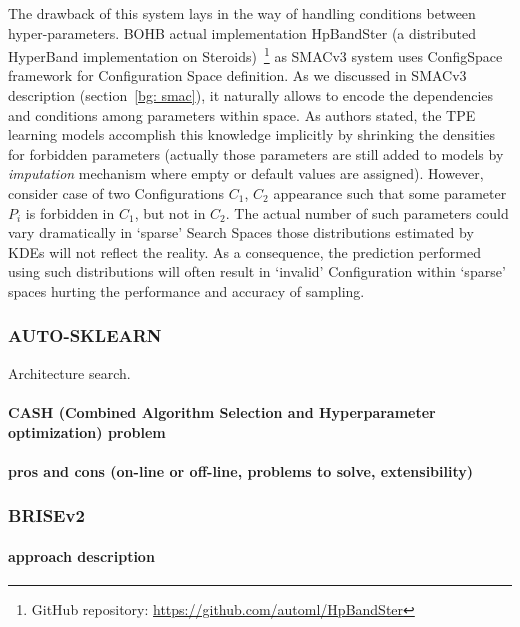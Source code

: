 The drawback of this system lays in the way of handling conditions between hyper-parameters. BOHB actual implementation HpBandSter (a distributed HyperBand implementation on Steroids)~\footnote{GitHub repository: \url{https://github.com/automl/HpBandSter}} as SMACv3 system uses ConfigSpace framework for Configuration Space definition. As we discussed in SMACv3 description (section~\ref{bg: smac}), it naturally allows to encode the dependencies and conditions among parameters within space. As authors stated, the TPE learning models accomplish this knowledge implicitly by shrinking the densities for forbidden parameters (actually those parameters are still added to models by \textit{imputation} mechanism where empty or default values are assigned). 
However, consider case of two Configurations $C_1$, $C_2$ appearance such that some parameter $P_i$ is forbidden in $C_1$, but not in $C_2$. The actual number of such parameters could vary dramatically in `sparse' Search Spaces those distributions estimated by KDEs will not reflect the reality. As a consequence, the prediction performed using such distributions will often result in `invalid' Configuration within `sparse' spaces hurting the performance and accuracy of sampling.



\subsubsection{AUTO-SKLEARN}
Architecture search.
\paragraph{CASH (Combined Algorithm Selection and Hyperparameter optimization) problem}
\paragraph{pros and cons (on-line or off-line, problems to solve, extensibility)}\cite{autosklearn:feurer2015efficient}

\subsubsection{BRISEv2}
\paragraph{approach description}


